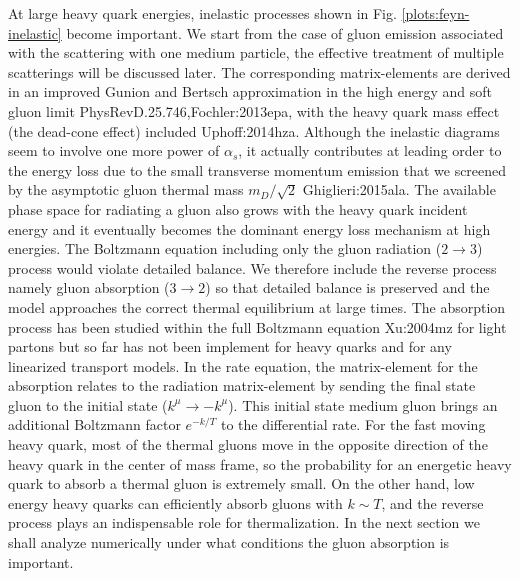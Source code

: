 At large heavy quark energies, inelastic processes shown in Fig. \ref{plots:feyn-inelastic} become important.
We start from the case of gluon emission associated with the scattering with one medium particle, the effective treatment of multiple scatterings will be discussed later.
The corresponding matrix-elements are derived in an improved Gunion and Bertsch approximation in the high energy and soft gluon limit {PhysRevD.25.746,Fochler:2013epa}, with the heavy quark mass effect (the dead-cone effect) included {Uphoff:2014hza}.
Although the inelastic diagrams seem to involve one more power of $\alpha_s$, it actually contributes at leading order to the energy loss due to the small transverse momentum emission that we screened by the asymptotic gluon thermal mass $m_D/\sqrt{2}$ {Ghiglieri:2015ala}.
The available phase space for radiating a gluon also grows with the heavy quark incident energy and it eventually becomes the dominant energy loss mechanism at high energies.
The Boltzmann equation including only the gluon radiation ($2\rightarrow 3$) process would violate detailed balance. We therefore include the reverse process namely gluon absorption ($3\rightarrow 2$) so that detailed balance is preserved and the model approaches the correct thermal equilibrium at large times.
The absorption process has been studied within the full Boltzmann equation {Xu:2004mz} for light partons but so far has not been implement for heavy quarks and for any linearized transport models.
In the rate equation, the matrix-element for the absorption relates to the radiation matrix-element by sending the final state gluon to the initial state ($k^\mu \rightarrow -k^\mu$).
This initial state medium gluon brings an additional Boltzmann factor $e^{-k/T}$ to the differential rate.
For the fast moving heavy quark, most of the thermal gluons move in the opposite direction of the heavy quark in the center of mass frame,
so the probability for an energetic heavy quark to absorb a thermal gluon is extremely small. 
On the other hand, low energy heavy quarks can efficiently absorb gluons with $k \sim T$, and the reverse process plays an indispensable role for thermalization. 
In the next section we shall analyze numerically under what conditions the gluon absorption is important.

